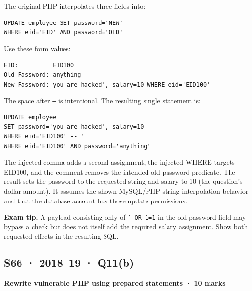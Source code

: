 \documentclass[11pt,a4paper]{article}
\begin{document}
The original PHP interpolates three fields into:



\begin{Verbatim}[breaklines=true,breakanywhere=true,fontsize=\small,frame=single,rulecolor=\color{PanelBorder}]
UPDATE employee SET password='NEW'
WHERE eid='EID' AND password='OLD'
\end{Verbatim}

Use these form values:



\begin{Verbatim}[breaklines=true,breakanywhere=true,fontsize=\small,frame=single,rulecolor=\color{PanelBorder}]
EID:          EID100
Old Password: anything
New Password: you_are_hacked', salary=10 WHERE eid='EID100' -- 
\end{Verbatim}

The space after \texttt{--} is intentional. The resulting single statement is:



\begin{Verbatim}[breaklines=true,breakanywhere=true,fontsize=\small,frame=single,rulecolor=\color{PanelBorder}]
UPDATE employee
SET password='you_are_hacked', salary=10
WHERE eid='EID100' -- '
WHERE eid='EID100' AND password='anything'
\end{Verbatim}

The injected comma adds a second assignment,\allowbreak{} the injected WHERE targets EID100,\allowbreak{} and the comment removes the intended old-password predicate. The result sets the password to the requested string and salary to 10 (the question’s dollar amount). It assumes the shown MySQL/\allowbreak{}PHP string-interpolation behavior and that the database account has those update permissions.



{\color{ForestGreen}\textbf{Exam tip.} A payload consisting only of \texttt{' OR 1=\allowbreak{}1} in the old-password field may bypass a check but does not itself add the required salary assignment. Show both requested effects in the resulting SQL.}




\clearpage
\subsection{S66 · 2018–19 · Q11(b)}\label{s66}

\textbf{Rewrite vulnerable PHP using prepared statements · 10 marks}
\end{document}
